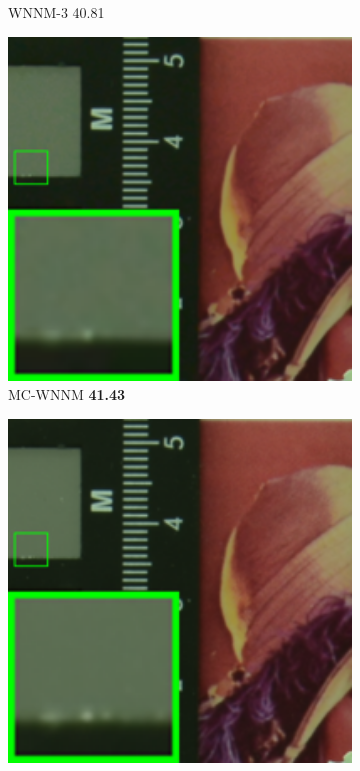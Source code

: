 \begin{figure}
\begin{subfigure}[t]{0.19\textwidth}
		\caption{WNNM-3 40.81}
    \end{subfigure}
    \hfill
    \begin{subfigure}[t]{0.19\textwidth}
        \centering
        \includegraphics[width=1\textwidth]{images/mcwnnm/resize_br_CWNNM_ADMM_NL_CC15_d800_iso1600_2.png}
		\caption{MC-WNNM \textbf{41.43}}
    \end{subfigure}
    \hfill
    \begin{subfigure}[t]{0.19\textwidth}
        \centering
        \includegraphics[width=1\textwidth]{images/mcwnnm/resize_br_d800_iso1600_2.png}

\end{subfigure}
\end{figure}
